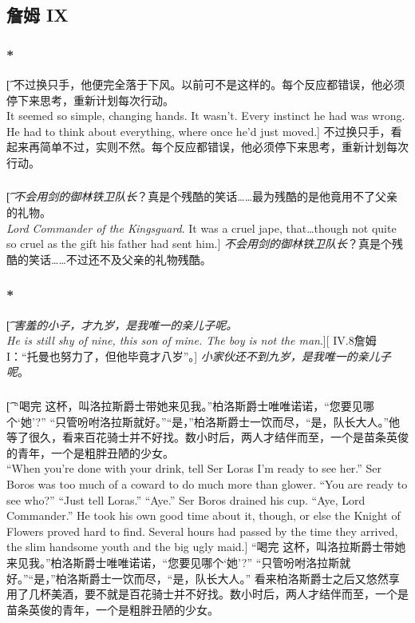 \documentclass[12pt,a4paper]{article}
\begin{document}
\subsection{詹姆 IX}
\subsubsection{\color{red}*}\t[
	不过换只手，他便完全落于下风。以前可不是这样的。每个反应都错误，他必须停下来思考，重新计划每次行动。\\
	It seemed so simple, changing hands. It wasn't. Every instinct he had was wrong. He had to think about everything, where once he'd just moved.]
	不过换只手，看起来再简单不过，实则不然。每个反应都错误，他必须停下来思考，重新计划每次行动。
	
\subsubsection{}\t[
	\emph{不会用剑的御林铁卫队长}？真是个残酷的笑话……最为残酷的是他竟用不了父亲的礼物。\\
	\emph{Lord Commander of the Kingsguard}. It was a cruel jape, that\ldots  though not quite so cruel as the gift his father had sent him.]
	\emph{不会用剑的御林铁卫队长}？真是个残酷的笑话……不过还不及父亲的礼物残酷。
	
\subsubsection{\color{red}*}\t[
	\emph{害羞的小子，才九岁，是我唯一的亲儿子呢。\\
	He is still shy of nine, this son of mine. The boy is not the man}.][
	IV.8詹姆 I：“托曼也努力了，但他毕竟才八岁”。]
	\emph{小家伙还不到九岁，是我唯一的亲儿子呢}。
	
\subsubsection{}\t[
	“喝完 这杯，叫洛拉斯爵士带她来见我。”柏洛斯爵士唯唯诺诺，“您要见哪个‘她’?” “只管吩咐洛拉斯就好。”“是，”柏洛斯爵士一饮而尽，“是，队长大人。”他等了很久，看来百花骑士并不好找。数小时后，两人才结伴而至，一个是苗条英俊的青年，一个是粗胖丑陋的少女。\\
	“When you're done with your drink, tell Ser Loras I'm ready to see her.” Ser Boros was too much of a coward to do much more than glower. “You are ready to see who?” “Just tell Loras.” “Aye.” Ser Boros drained his cup. “Aye, Lord Commander.” He took his own good time about it, though, or else the Knight of Flowers proved hard to find. Several hours had passed by the time they arrived, the slim handsome youth and the big ugly maid.]
	“喝完 这杯，叫洛拉斯爵士带她来见我。”柏洛斯爵士唯唯诺诺，“您要见哪个‘她’?” “只管吩咐洛拉斯就好。”“是，”柏洛斯爵士一饮而尽，“是，队长大人。” 看来柏洛斯爵士之后又悠然享用了几杯美酒，要不就是百花骑士并不好找。数小时后，两人才结伴而至，一个是苗条英俊的青年，一个是粗胖丑陋的少女。
	
\end{document}

